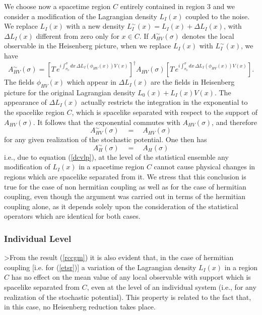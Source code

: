 \documentclass[10pt,a4paper]{article}
\begin{document}
We choose now a spacetime region $C$ entirely contained in region
3 and we consider a modification of the Lagrangian density
$L_{I}(x)$ coupled to the noise. We replace $L_{I}(x)$ with a new
density $L_{I}^{\sim}(x) = L_{I}(x) + \Delta L_{I}(x)$, with
$\Delta L_{I}(x)$ different from zero only for $x \in C$. If
$A_{HV}^{\sim}(\sigma)$ denotes the local observable in the
Heisenberg picture, when we replace $L_{I}(x)$ with
$L_{I}^{\sim}(x)$, we have
\begin{equation}
A_{HV}^{\sim}(\sigma) = \left[ T\,e^{ i\int_{\sigma_{0}}^{\sigma}
dx\, \Delta L_{I}(\phi_{HV}(x)) V(x)} \right]^{\dagger}
A_{HV}(\sigma) \left[ T\,e^{ i\int_{\sigma_{0}}^{\sigma} dx\,
\Delta L_{I}(\phi_{HV}(x)) V(x)} \right].
\end{equation}
The fields $\phi_{HV}(x)$ which appear in $\Delta L_{I}(x)$ are
the fields in Heisenberg picture for the original Lagrangian
density $L_{0}(x) + L_{I}(x) V(x)$. The appearance of $\Delta
L_{I}(x)$ actually restricts the integration in the exponential to
the spacelike region $C$, which is spacelike separated with
respect to the support of $A_{HV}(\sigma)$. It follows that the
exponential commutes with $A_{HV}(\sigma)$, and therefore
\begin{equation} \label{rccgm}
A_{HV}^{\sim}(\sigma) \quad = \quad A_{HV}(\sigma)
\end{equation}
for any given realization of the stochastic potential. One then
has
\begin{equation}
A_{H}^{\sim}(\sigma) \quad = \quad A_{H}(\sigma)
\end{equation}
i.e., due to equation (\ref{dcvlp}), at the level of the
statistical ensemble any modification of $L_{I}(x)$ in a spacetime
region $C$ cannot cause physical changes in regions which are
spacelike separated from it. We stress that this conclusion is
true for the case of non hermitian coupling as well as for the
case of hermitian coupling, even though the argument was carried
out in terms of the hermitian coupling alone, as it depends solely
upon the consideration of the statistical operators which are
identical for both cases.

\subsubsection{Individual Level} \label{sec1022}

>From the result (\ref{rccgm}) it is also evident that, in the case
of hermitian coupling [i.e. for (\ref{etsr})] a variation of the
Lagrangian density $L_{I}(x)$ in a region $C$ has no effect on the
mean value of any local observable with support which is spacelike
separated from $C$, even at the level of an individual system
(i.e., for any realization of the stochastic potential). This
property is related to the fact that, in this case, no Heisenberg
reduction takes place.
\end{document}
